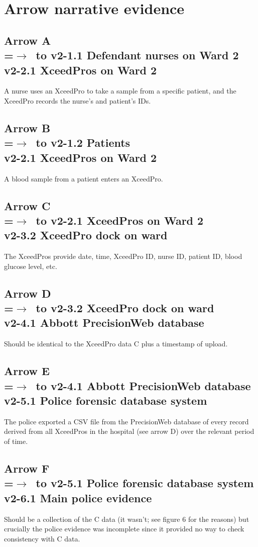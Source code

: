 \section*{Arrow narrative evidence}
\subsection*{Arrow  A\\
=\hbox{$\rightarrow$~}\hbox to v2-1.1 Defendant nurses on Ward 2\\v2-2.1 XceedPros on Ward 2}
A nurse uses an XceedPro to take a sample from a specific patient, and the XceedPro records the nurse’s and patient's IDs.
\subsection*{Arrow  B\\
=\hbox{$\rightarrow$~}\hbox to v2-1.2 Patients\\v2-2.1 XceedPros on Ward 2}
A blood sample from a patient enters an XceedPro.
\subsection*{Arrow  C\\
=\hbox{$\rightarrow$~}\hbox to v2-2.1 XceedPros on Ward 2\\v2-3.2 XceedPro dock on ward}
The XceedPros provide date, time, XceedPro ID, nurse ID, patient ID, blood glucose level, etc.
\subsection*{Arrow  D\\
=\hbox{$\rightarrow$~}\hbox to v2-3.2 XceedPro dock on ward\\v2-4.1 Abbott PrecisionWeb database}
Should be identical to the XceedPro data C plus a timestamp of upload.
\subsection*{Arrow  E\\
=\hbox{$\rightarrow$~}\hbox to v2-4.1 Abbott PrecisionWeb database\\v2-5.1 Police forensic database system}
The police exported a CSV file from the PrecisionWeb database of every record derived from all XceedPros in the hospital (see arrow D) over the relevant period of time. 
\subsection*{Arrow   F\\
=\hbox{$\rightarrow$~}\hbox to v2-5.1 Police forensic database system\\v2-6.1 Main police evidence}
Should be a collection of the C data (it wasn’t; see figure 6 for the reasons) but crucially the police evidence was incomplete since it provided no way to check consistency with C data.

